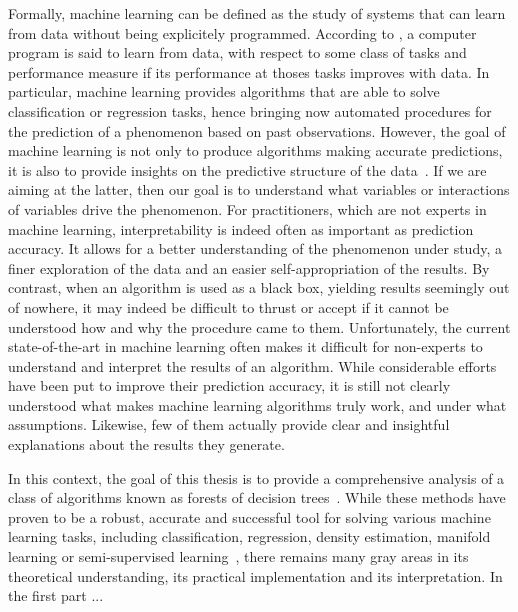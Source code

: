 Formally, machine learning can be defined as the study of systems that can
learn from data without being explicitely programmed. According to
\citet{mitchell:1997}, a computer program is said to learn from data, with
respect to some class of tasks and performance measure if its performance at
thoses tasks improves with data. In particular, machine learning provides
algorithms that are able to solve classification or regression tasks, hence
bringing now automated procedures for the prediction of a phenomenon based on
past observations. However, the goal of machine learning is not only to produce
algorithms making accurate predictions, it is also to provide insights on the
predictive structure of the data~\citep{breiman:1984}. If we are aiming at the
latter, then our goal is to understand what variables or interactions of
variables drive the phenomenon. For practitioners, which are not experts in
machine learning, interpretability is indeed often as important as prediction
accuracy. It allows for a better understanding of the phenomenon under study, a
finer exploration of the data and an easier self-appropriation of the results.
By contrast, when an algorithm is used as a black box, yielding results
seemingly out of nowhere, it may indeed be difficult to thrust or accept if it
cannot be understood how and why the procedure came to them. Unfortunately, the
current state-of-the-art in machine learning often makes it difficult for
non-experts to understand and interpret the results of an algorithm. While
considerable efforts have been put to improve their prediction accuracy, it is
still not clearly understood what makes machine learning algorithms truly work,
and under what assumptions. Likewise, few of them actually provide clear and
insightful explanations about the results they generate.

In this context, the goal of this thesis is to provide a comprehensive analysis
of a class of algorithms known as forests of decision
trees~\citep{breiman:2001,geurts:2006}. While these methods have proven to be
a robust, accurate and successful tool for solving various machine learning
tasks, including classification, regression, density estimation, manifold
learning or semi-supervised learning~\citep{criminisi:2011}, there remains
many gray areas in its theoretical understanding, its practical implementation
and its interpretation. In the first part ...




